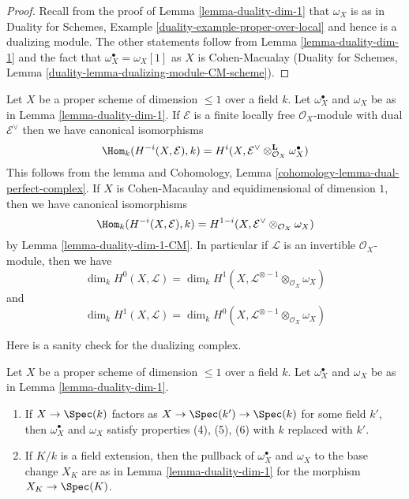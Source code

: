 \begin{proof}
Recall from the proof of Lemma \ref{lemma-duality-dim-1}
that $\omega_X$ is as in Duality for Schemes, Example
\ref{duality-example-proper-over-local} and hence is
a dualizing module. The other statements follow from
Lemma \ref{lemma-duality-dim-1}
and the fact that $\omega_X^\bullet = \omega_X[1]$
as $X$ is Cohen-Macualay (Duality for Schemes, Lemma
\ref{duality-lemma-dualizing-module-CM-scheme}).
\end{proof}

\begin{remark}
\label{remark-rework-duality-locally-free}
Let $X$ be a proper scheme of dimension $\leq 1$ over a field $k$.
Let $\omega_X^\bullet$ and $\omega_X$ be as in Lemma \ref{lemma-duality-dim-1}.
If $\mathcal{E}$ is a finite locally free $\mathcal{O}_X$-module
with dual $\mathcal{E}^\vee$ then we have canonical isomorphisms
$$
\Hom_k(H^{-i}(X, \mathcal{E}), k) =
H^i(X, \mathcal{E}^\vee \otimes_{\mathcal{O}_X}^\mathbf{L} \omega_X^\bullet)
$$
This follows from the lemma and
Cohomology, Lemma \ref{cohomology-lemma-dual-perfect-complex}.
If $X$ is Cohen-Macaulay and equidimensional of dimension $1$, then
we have canonical isomorphisms
$$
\Hom_k(H^{-i}(X, \mathcal{E}), k) =
H^{1 - i}(X, \mathcal{E}^\vee \otimes_{\mathcal{O}_X} \omega_X)
$$
by Lemma \ref{lemma-duality-dim-1-CM}. In particular
if $\mathcal{L}$ is an invertible $\mathcal{O}_X$-module, then we have
$$
\dim_k H^0(X, \mathcal{L}) =
\dim_k H^1(X, \mathcal{L}^{\otimes -1} \otimes_{\mathcal{O}_X} \omega_X)
$$
and
$$
\dim_k H^1(X, \mathcal{L}) =
\dim_k H^0(X, \mathcal{L}^{\otimes -1} \otimes_{\mathcal{O}_X} \omega_X)
$$
\end{remark}

\noindent
Here is a sanity check for the dualizing complex.

\begin{lemma}
\label{lemma-sanity-check-duality}
Let $X$ be a proper scheme of dimension $\leq 1$ over a field $k$.
Let $\omega_X^\bullet$ and $\omega_X$ be as in Lemma \ref{lemma-duality-dim-1}.
\begin{enumerate}
\item If $X \to \Spec(k)$ factors as $X \to \Spec(k') \to \Spec(k)$
for some field $k'$, then $\omega_X^\bullet$ and $\omega_X$
satisfy properties (4), (5), (6) with $k$ replaced with $k'$.
\item If $K/k$ is a field extension, then the pullback of
$\omega_X^\bullet$ and $\omega_X$ to the base change $X_K$
are as in  Lemma \ref{lemma-duality-dim-1} for the morphism
$X_K \to \Spec(K)$.
\end{enumerate}
\end{lemma}

